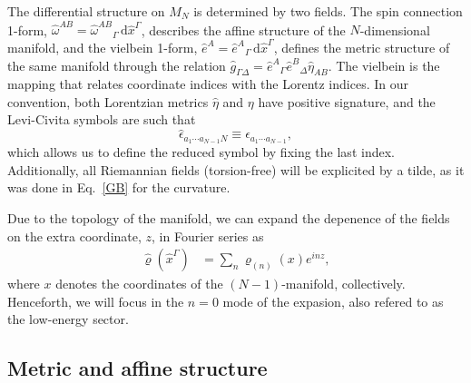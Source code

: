 \documentclass[aps,prd,12pt,superscriptaddress,showpacs,showkeys,longbibliography,reprint,nofootinbib]{revtex4-1}
\begin{document}
The differential structure on $M_N$ is determined by two fields. The spin connection 1-form, $\hat{\omega}^{AB} = \hat{\omega}^{AB}{}_{\Gamma}\,\text{d}\hat{x}^\Gamma$, describes the affine structure of the $N$-dimensional manifold, and the vielbein 1-form, $\hat{e}^A=\hat{e}^{A}{}_{\Gamma}\,\text{d}\hat{x}^\Gamma$, defines the metric structure of the same manifold through the relation $\hat{g}_{\Gamma\Delta} = \hat{e}^{A}{}_{\Gamma}\hat{e}^{B}{}_{\Delta}\hat{\eta}_{AB}$. The vielbein is the mapping that relates coordinate indices with the Lorentz indices.
In our convention, both Lorentzian metrics \(\hat{\eta}\) and \(\eta\) have positive signature, and the Levi-Civita symbols are such that
\[\hat{\epsilon}_{a_1 \cdots a_{N-1} N} \equiv \epsilon_{a_1 \cdots a_{N-1}},\]
which allows us to define the reduced symbol by fixing the last index. Additionally, all Riemannian fields (torsion-free) will be explicited by a tilde, as it was done in Eq.~\eqref{GB} for the curvature.

Due to the topology of the manifold, we can expand the depenence of the fields on the extra coordinate, $z$, in Fourier series as  
\begin{align}\label{Fourier}
  \hat{\varrho}(\hat{x}^\Gamma)&=\sum_n\varrho_{(n)}(x)e^{i n z},
\end{align}
where $x$ denotes the coordinates of the $(N-1)$-manifold, collectively. Henceforth, we will focus in the $n=0$ mode of the expasion, also refered to as the low-energy sector.

\subsection{Metric and affine structure}
\end{document}
